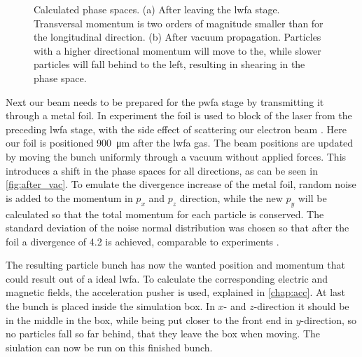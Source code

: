 \documentclass[bachelor_thesis]{subfiles}
\begin{document}
\begin{figure}
\begin{subfigure}{\textwidth}
	\missingfigure{}
	\label{fig:after_lwfa}
\end{subfigure}
\newline
\begin{subfigure}{\textwidth}
	\missingfigure{}
	\label{fig:after_vac}
\end{subfigure}

\caption{Calculated phase spaces. (a) After leaving the \gls{lwfa} stage. Transversal momentum is two orders of magnitude smaller than for the longitudinal direction. (b) After vacuum propagation. Particles with
a higher directional momentum will move to the, while slower particles will fall behind to the left, resulting in shearing in the phase space.}
\end{figure}

Next our beam needs to be prepared for the \gls{pwfa} stage by transmitting it through a metal foil. In experiment the foil is used to block of the laser from the preceding \gls{lwfa} stage, 
with the side effect of scattering our electron beam \cite{Raj2020}. Here our foil is positioned \qty{900}{\um} after the \gls{lwfa} gas.
The beam positions are updated by moving the bunch uniformly through a vacuum without applied forces. This introduces a shift in the phase spaces for all directions, as can be seen in \autoref{fig:after_vac}.
To emulate the divergence increase of the metal foil, random noise is added to the momentum in $p_x$ and $p_z$ direction, while the new $p_y$ will be calculated so that the total momentum for each particle is conserved.
The standard deviation of the noise normal distribution was chosen so that after the foil a divergence of \qty{4.2}{\mrad} is achieved, comparable to experiments \cite{Schoebel2022}.

The resulting particle bunch has now the wanted position and momentum that could result out of a ideal \gls{lwfa}. To calculate the corresponding electric and magnetic fields, the acceleration pusher is used, explained in \autoref{chap:acc}.
At last the bunch is placed inside the simulation box. In $x$- and $z$-direction it should be in the middle in the box, while being put closer to the front end in $y$-direction, so no particles fall so far behind, that they leave the box when moving.
The siulation can now be run on this finished bunch.
\end{document}
